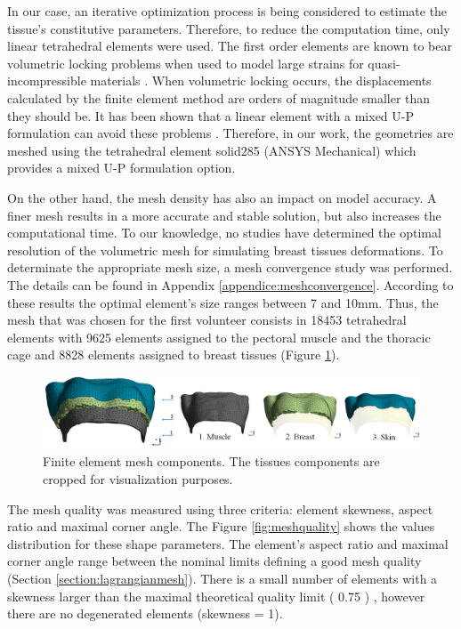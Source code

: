 In our case, an iterative optimization process is being considered to estimate the tissue's constitutive parameters. Therefore, to reduce the computation time, only linear tetrahedral elements were used. The first order elements are known to bear volumetric locking problems when used to model large strains for quasi-incompressible materials \citep{fung_classical_2017}. When volumetric locking occurs, the displacements calculated by the finite element method are orders of magnitude smaller than they should be. It has been shown that a linear element with a mixed U-P formulation can avoid these problems \citep{rohan_finite_2014}. Therefore, in our work, the geometries are meshed using the tetrahedral element solid285 (ANSYS Mechanical) which provides a mixed U-P formulation option. 

 On the other hand, the mesh density has also an impact on model accuracy. A finer mesh results in a more accurate and stable solution, but also increases the computational time. To our knowledge, no studies have determined the optimal resolution of the volumetric mesh for simulating breast tissues deformations. To determinate the appropriate mesh size, a mesh convergence study was performed. The details can be found in Appendix \ref{appendice:meshconvergence}.  According to these results the optimal element’s size ranges between 7 and 10mm. Thus, the mesh that was chosen for the first volunteer consists in 18453 tetrahedral elements with 9625 elements assigned to the pectoral muscle and the thoracic cage and 8828 elements assigned to breast tissues (Figure \ref{fig:meshcomponents}).
 
 \begin{figure}[!h]
\centering
\includegraphics[width=1\textwidth,keepaspectratio]{figures/mesh3components.png} 
\caption{ Finite element mesh components. The tissues components are cropped for visualization purposes. }\label{fig:meshcomponents}
\end{figure}
 
 The mesh quality was measured using three criteria: element skewness, aspect ratio and maximal corner angle. The Figure \ref{fig:meshquality} shows the values distribution for these shape parameters. The element's aspect ratio and maximal corner angle range between the nominal limits defining a good mesh quality (Section \ref{section:lagrangianmesh}). There is a small number of elements with a skewness larger than the maximal theoretical quality limit ( 0.75 ) , however there are no degenerated elements (skewness = 1).  

